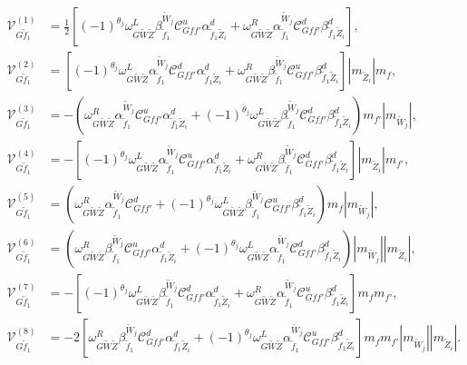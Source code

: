 \documentclass[final,3p,times,pdflatex]{elsarticle}
\begin{document}
\begin{align}
\mathcal{V}_{G \tilde{f}_1}^{(1)} &= \frac{1}{2}[(-1)^{\theta_j}\omega_{G \tilde{W} \tilde{Z}}^L \beta_{\tilde{f}_1}^{\tilde{W}_j} \mathcal{C}_{G f f'}^u \alpha_{\tilde{f}_1 \tilde{Z}_{i}}^{d} + \omega_{G \tilde{W} \tilde{Z}}^R \alpha_{\tilde{f}_1}^{\tilde{W}_j} \mathcal{C}_{G f f'}^d \beta_{\tilde{f}_1 \tilde{Z}_{i}}^{d}], \\
\mathcal{V}_{G \tilde{f}_1}^{(2)} &= [(-1)^{\theta_j}\omega_{G \tilde{W} \tilde{Z}}^L \alpha_{\tilde{f}_1}^{\tilde{W}_j} \mathcal{C}_{G f f'}^d \alpha_{\tilde{f}_1 \tilde{Z}_{i}}^{d} + \omega_{G \tilde{W} \tilde{Z}}^R \beta_{\tilde{f}_1}^{\tilde{W}_j} \mathcal{C}_{G f f'}^u \beta_{\tilde{f}_1 \tilde{Z}_{i}}^{d}]|m_{\tilde{Z}_i}|m_{f}, \\
\mathcal{V}_{G \tilde{f}_1}^{(3)} &= -(\omega_{G \tilde{W} \tilde{Z}}^R \alpha_{\tilde{f}_1}^{\tilde{W}_j} \mathcal{C}_{G f f'}^u \alpha_{\tilde{f}_1 \tilde{Z}_i}^{d} + (-1)^{\theta_j} \omega_{G \tilde{W} \tilde{Z}}^L \beta_{\tilde{f}_1}^{\tilde{W}_j} \mathcal{C}_{G f f'}^d \beta_{\tilde{f}_1 \tilde{Z}_{i}}^{d})m_{f'}|m_{\tilde{W}_j}|, \\
\mathcal{V}_{G \tilde{f}_1}^{(4)} &= -[(-1)^{\theta_j}\omega_{G \tilde{W} \tilde{Z}}^L \alpha_{\tilde{f}_1}^{\tilde{W}_j} \mathcal{C}_{G f f'}^u  \alpha_{\tilde{f}_1 \tilde{Z}_i}^{d} + \omega_{G \tilde{W} \tilde{Z}}^R \beta_{\tilde{f}_1}^{\tilde{W}_j} \mathcal{C}_{G f f'}^d \beta_{\tilde{f}_1 \tilde{Z}_{i}}^{d}]|m_{\tilde{Z}_i}|m_{f'}, \\
\mathcal{V}_{G \tilde{f}_1}^{(5)} &= (\omega_{G \tilde{W} \tilde{Z}}^R \alpha_{\tilde{f}_1}^{\tilde{W}_j} \mathcal{C}_{G f f'}^d + (-1)^{\theta_j}\omega_{G \tilde{W} \tilde{Z}}^L \beta_{\tilde{f}_1}^{\tilde{W}_j} \mathcal{C}_{G f f'}^u \beta_{\tilde{f}_1 \tilde{Z}_{i}}^{d})m_{f}|m_{\tilde{W}_j}| ,\\
\mathcal{V}_{G \tilde{f}_1}^{(6)} &= (\omega_{G \tilde{W} \tilde{Z}}^R \beta_{\tilde{f}_1}^{\tilde{W}_j} \mathcal{C}_{G f f'}^u \alpha_{\tilde{f}_1 \tilde{Z}_i}^{d} + (-1)^{\theta_j} \omega_{G \tilde{W} \tilde{Z}}^L \alpha_{\tilde{f}_1}^{\tilde{W}_j} \mathcal{C}_{G f f'}^d \beta_{\tilde{f}_1 \tilde{Z}_{i}}^{d})|m_{\tilde{W}_j}||m_{\tilde{Z}_i}|, \\
\mathcal{V}_{G \tilde{f}_1}^{(7)} &= -[(-1)^{\theta_j}\omega_{G \tilde{W} \tilde{Z}}^L \beta_{\tilde{f}_1}^{\tilde{W}_j} \mathcal{C}_{G f f'}^d \alpha_{\tilde{f}_1 \tilde{Z}_i}^{d} + \omega_{G \tilde{W} \tilde{Z}}^R \alpha_{\tilde{f}_1}^{\tilde{W}_j} \mathcal{C}_{G f f'}^u \beta_{\tilde{f}_1 \tilde{Z}_{i}}^{d}]m_{f}m_{f'}, \\
\mathcal{V}_{G \tilde{f}_1}^{(8)} &= -2[\omega_{G \tilde{W} \tilde{Z}}^R \beta_{\tilde{f}_1}^{\tilde{W}_j} \mathcal{C}_{G f f'}^d \alpha_{\tilde{f}_1 \tilde{Z}_i}^{d} + (-1)^{\theta_j} \omega_{G \tilde{W} \tilde{Z}}^L \alpha_{\tilde{f}_1}^{\tilde{W}_j} \mathcal{C}_{G f f'}^u \beta_{\tilde{f}_1 \tilde{Z}_{i}}^{d}]m_{f}m_{f'}|m_{\tilde{W}_j}||m_{\tilde{Z}_i}|.
\end{align}
\end{document}

